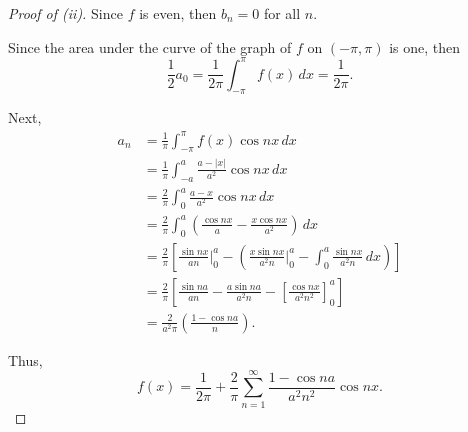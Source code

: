 \documentclass[../hw5]{subfiles}
\begin{document}
\begin{proof}[Proof of (ii)]
	Since $f$ is even, then $b_n=0$ for all $n$.

	Since the area under the curve of the graph of $f$ on $(-\pi,\pi)$ is one, then \[
		\frac{1}{2}a_0 = \frac{1}{2\pi}\int_{-\pi}^{\pi} f(x) \,dx = \frac{1}{2\pi}
		.\]

	Next,
	\begin{align*}
		a_n & = \frac{1}{\pi} \int_{-\pi}^{\pi} f(x)\cos{nx} \,dx                                                                                                                   \\
		    & = \frac{1}{\pi}\int_{-a }^{a} \frac{a- |x|}{a^2}\cos{nx}\,dx                                                                                                          \\
		    & = \frac{2}{\pi}\int_{0}^{a} \frac{a-x}{a^2}\cos{nx} \,dx                                                                                                              \\
		    & = \frac{2}{\pi}\int_{0}^{a} \left( \frac{\cos{nx}}{a}-\frac{x\cos{nx}}{a^2} \right) \,dx                                                                              \\
		    & = \frac{2}{\pi}\left[ \frac{\sin{nx} }{an}\bigg\vert_0^a - \left( \frac{x\sin{nx} }{a^2 n}\bigg\vert_0^a - \int_{0}^{a} \frac{\sin{nx} }{a^2 n} \,dx \right)  \right] \\
		    & = \frac{2}{\pi} \left[ \frac{\sin{na} }{an}- \frac{a\sin{na} }{a^2 n} - {\left[ \frac{\cos{nx} }{a^2n^2} \right] }_0^a \right]                                        \\
		    & = \frac{2}{a^2 \pi} \left( \frac{1-\cos{na} }{n} \right)
		.\end{align*}

	Thus, \[
		f(x) = \frac{1}{2\pi} + \frac{2}{\pi}\sum_{n=1}^{\infty} \frac{1-\cos{na} }{a^2n^2}\cos{nx}
		.\]
\end{proof}
\end{document}
